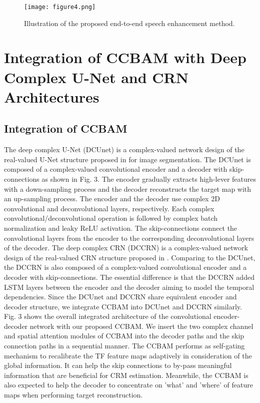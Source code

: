 \documentclass{article}
\begin{document}
\begin{figure}[t]
  \centering
  \texttt{[image: figure4.png]}
  \caption{Illustration of the proposed end-to-end speech enhancement method.}
  \label{fig1}
\end{figure}

\section{Integration of CCBAM with Deep Complex U-Net and CRN Architectures}
\label{sec:pagestyle}
\subsection{Integration of CCBAM}
The deep complex U-Net (DCUnet) \cite{Choi2019} is a complex-valued network design of the real-valued U-Net structure proposed in \cite{Ronneberger2015} for image segmentation. The DCUnet is composed of a complex-valued convolutional encoder and a decoder with skip-connections as shown in Fig. 3. The encoder gradually extracts high-lever features with a down-sampling process and the decoder reconstructs the target map with an up-sampling process. The encoder and the decoder use complex 2D convolutional and deconvolutional layers, respectively. Each complex convolutional/deconvolutional operation is followed by complex batch normalization and leaky ReLU activation. The skip-connections connect the convolutional layers from the encoder to the corresponding deconvolutional layers of the decoder. The deep complex CRN (DCCRN) \cite{Hu2020} is a complex-valued network design of the real-valued CRN structure proposed in \cite{Tan2018}. Comparing to the DCUnet, the DCCRN is also composed of a complex-valued convolutional encoder and a decoder with skip-connections. The essential difference is that the DCCRN added LSTM layers between the encoder and the decoder aiming to model the temporal dependencies. Since the DCUnet and DCCRN share equivalent encoder and decoder structure, we integrate CCBAM into DCUnet and DCCRN similarly. Fig. 3 shows the overall integrated architecture of the convolutional encoder-decoder network with our proposed CCBAM. We insert the two complex channel and spatial attention modules of CCBAM into the decoder paths and the skip connection paths in a sequential manner. The CCBAM performs as self-gating mechanism to recalibrate the TF feature maps adaptively in consideration of the global information. It can help the skip connections to by-pass meaningful information that are beneficial for CRM estimation. Meanwhile, the CCBAM is also expected to help the decoder to concentrate on 'what' and 'where' of feature maps when performing target reconstruction.
\end{document}
